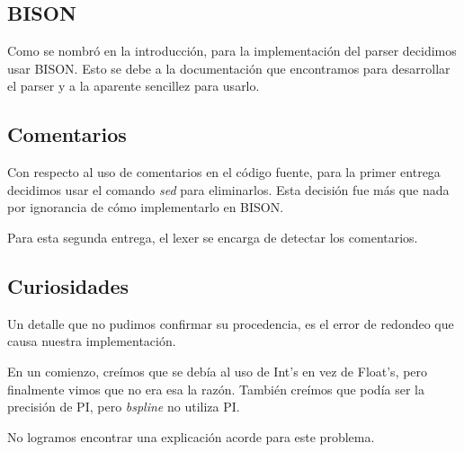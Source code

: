 \subsection{BISON}
Como se nombró en la introducción, para la implementación del parser decidimos usar BISON. Esto se debe a la documentación que encontramos para desarrollar el parser y a la aparente sencillez para usarlo.

\subsection{Comentarios}
Con respecto al uso de comentarios en el código fuente, para la primer entrega decidimos usar el comando \textit{sed} para eliminarlos. Esta decisión fue más que nada por ignorancia de cómo implementarlo en BISON. 

Para esta segunda entrega, el lexer se encarga de detectar los comentarios.


\subsection{Curiosidades}
Un detalle que no pudimos confirmar su procedencia, es el error de redondeo que causa nuestra implementación.

En un comienzo, creímos que se debía al uso de Int's en vez de Float's, pero finalmente vimos que no era esa la razón. También creímos que podía ser la precisión de PI, pero \textit{bspline} no utiliza PI.

No logramos encontrar una explicación acorde para este problema.